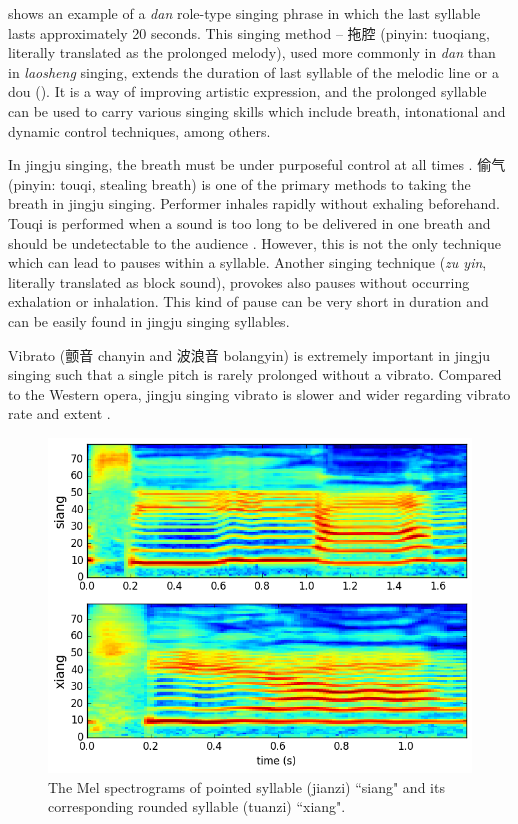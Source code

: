  shows an example of a \textit{dan} role-type singing phrase in which the last syllable lasts approximately 20 seconds. This singing method -- 拖腔 (pinyin: tuoqiang, literally translated as the prolonged melody), used more commonly in \textit{dan} than in \textit{laosheng} singing, extends the duration of last syllable of the melodic line or a dou (). It is a way of improving artistic expression, and the prolonged syllable can be used to carry various singing skills which include breath, intonational and dynamic control techniques, among others. 

In jingju singing, the breath must be under purposeful control at all times \cite{Wichmann1991a}. 偷气 (pinyin: touqi, stealing breath) is one of the primary methods to taking the breath in jingju singing. Performer inhales rapidly without exhaling beforehand. Touqi is performed when a sound is too long to be delivered in one breath and should be undetectable to the audience \cite{Wichmann1991a}. However, this is not the only technique which can lead to pauses within a syllable. Another singing technique (\textit{zu yin}, literally translated as block sound), provokes also pauses without occurring exhalation or inhalation. This kind of pause can be very short in duration and can be easily found in jingju singing syllables. 

Vibrato (颤音 chanyin and 波浪音 bolangyin) is extremely important in jingju singing such that a single pitch is rarely prolonged without a vibrato. Compared to the Western opera, jingju singing vibrato is slower and wider regarding vibrato rate and extent \cite{Yang2015a}. 

\begin{figure}[ht!]
    \includegraphics[width=\textwidth]{figs/spectro_vis/ch3_jianzi_mispronunciation.png}
    \caption{The Mel spectrograms of pointed syllable (jianzi) ``siang" and its corresponding rounded syllable (tuanzi) ``xiang".}
    \label{fig:ch3:jianzi_mispronunciation_example}
\end{figure}

